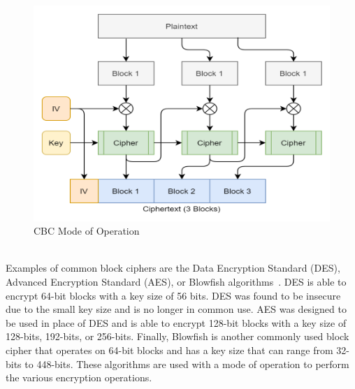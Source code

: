 \documentclass[journal]{IEEEtran}
\begin{document}
\begin{figure}[!htb]
\centerline{\includegraphics[totalheight=5cm]{pictures/cipher-cbc.png}}
    \caption{CBC Mode of Operation}
    \label{fig:cipher-cbc}
\end{figure}
\\
Examples of common block ciphers are the Data Encryption Standard (DES), Advanced Encryption Standard (AES), or Blowfish algorithms~\cite{BC3}. DES is able to encrypt 64-bit blocks with a key size of 56 bits. DES was found to be insecure due to the small key size and is no longer in common use. AES was designed to be used in place of DES and is able to encrypt 128-bit blocks with a key size of 128-bits, 192-bits, or 256-bits. Finally, Blowfish is another commonly used block cipher that operates on 64-bit blocks and has a key size that can range from 32-bits to 448-bits. These algorithms are used with a mode of operation to perform the various encryption operations.
\end{document}
